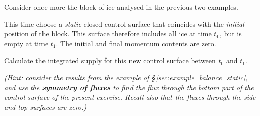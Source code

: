 \documentclass[a4paper,12pt,%
onecolumn,oneside,titlepage,%
british%
]{memoir}
\renewcommand*{\|}[1][]{\nonscript\:#1\vert\nonscript\:\mathopen{}}
\newcommand*{\sect}{\S}%
\newcommand*{\yti}{t_{0}}
\newcommand*{\ytf}{t_{1}}
\begin{document}
\smallskip

\begin{exercise}
  Consider once more the block of ice analysed in the previous two examples.

  This time choose a \emph{static} closed control surface that coincides with the \emph{initial} position of the block. This surface therefore includes all ice at time $\yti$, but is empty at time $\ytf$. The initial and final momentum contents are zero.

  Calculate the integrated supply for this new control surface between $\yti$ and $\ytf$.

  \emph{(Hint: consider the results from the example of \sect\,\ref{sec:example_balance_static}, and use the \textbf{symmetry of fluxes} to find the flux through the bottom part of the control surface of the present exercise. Recall also that the fluxes through the side and top surfaces are zero.)}
\end{exercise}

\bigskip
\end{document}
